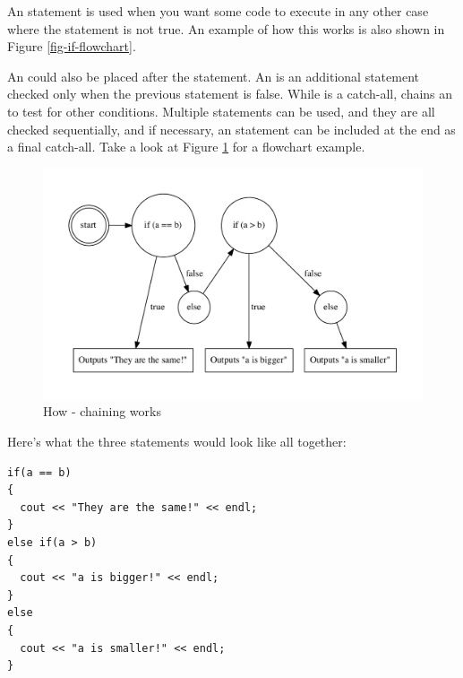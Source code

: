 An  statement is used when you want some code to execute in any other case where the  statement is not true. 
An example of how this works is also shown in Figure \ref{fig-if-flowchart}.


An  could also be placed after the  statement. 
An  is an additional  statement checked only when the previous  statement is false. 
While  is a catch-all,  chains an  to test for other conditions. 
Multiple  statements can be used, and they are all checked sequentially, and if necessary, an  statement can be included at the end as a final catch-all. 
Take a look at Figure \ref{fig-else-if-flowchart} for a flowchart example.




\begin{figure}[tbh]
  \centering
  \includegraphics[width=\textwidth]{diagrams/if-else.pdf}
  \caption{How - chaining works} \label{fig-else-if-flowchart}
\end{figure}

Here's what the three statements would look like all together: \nopagebreak[4]

\noindent\begin{minipage}{\linewidth}\begin{lstlisting}
if(a == b)
{
  cout << "They are the same!" << endl;
}
else if(a > b)
{
  cout << "a is bigger!" << endl;
}
else
{
  cout << "a is smaller!" << endl;
}
\end{lstlisting}\end{minipage}


